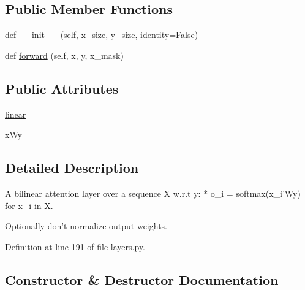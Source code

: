 \subsection*{Public Member Functions}
\begin{DoxyCompactItemize}
\item 
def \hyperlink{classparlai_1_1agents_1_1drqa_1_1layers_1_1BilinearSeqAttn_a78a4199a4dd90ac303f120cbe55af2a2}{\+\_\+\+\_\+init\+\_\+\+\_\+} (self, x\+\_\+size, y\+\_\+size, identity=False)
\item 
def \hyperlink{classparlai_1_1agents_1_1drqa_1_1layers_1_1BilinearSeqAttn_af6775803498ad914cd5e74cd228927e6}{forward} (self, x, y, x\+\_\+mask)
\end{DoxyCompactItemize}
\subsection*{Public Attributes}
\begin{DoxyCompactItemize}
\item 
\hyperlink{classparlai_1_1agents_1_1drqa_1_1layers_1_1BilinearSeqAttn_a9ec3eb5a5a3f38a5826b7dc02abbe925}{linear}
\item 
\hyperlink{classparlai_1_1agents_1_1drqa_1_1layers_1_1BilinearSeqAttn_a6a14946097618712765aba7243f0c075}{x\+Wy}
\end{DoxyCompactItemize}


\subsection{Detailed Description}
\begin{DoxyVerb}A bilinear attention layer over a sequence X w.r.t y:
* o_i = softmax(x_i'Wy) for x_i in X.

Optionally don't normalize output weights.
\end{DoxyVerb}
 

Definition at line 191 of file layers.\+py.



\subsection{Constructor \& Destructor Documentation}
\mbox{\label{classparlai_1_1agents_1_1drqa_1_1layers_1_1BilinearSeqAttn_a78a4199a4dd90ac303f120cbe55af2a2}} 
